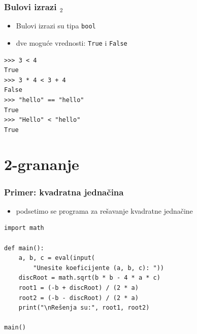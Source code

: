 \documentclass[utf8,compress,aspectratio=169]{beamer}
\begin{document}

\begin{frame}[fragile]
  \frametitle{Bulovi izrazi $_2$}
  \begin{itemize}
    \item Bulovi izrazi su tipa \texttt{bool}
    \item dve moguće vrednosti: \texttt{True} i \texttt{False}
  \end{itemize}
\begin{verbatim}
>>> 3 < 4
True
>>> 3 * 4 < 3 + 4
False
>>> "hello" == "hello"
True
>>> "Hello" < "hello"
True
\end{verbatim}
\end{frame}

\section{2-grananje}

\begin{frame}[fragile]
  \frametitle{Primer: kvadratna jednačina}
  \begin{itemize}
    \item podsetimo se programa za rešavanje kvadratne jednačine
  \end{itemize}
\begin{verbatim}
import math

def main():
    a, b, c = eval(input(
        "Unesite koeficijente (a, b, c): "))
    discRoot = math.sqrt(b * b - 4 * a * c)
    root1 = (-b + discRoot) / (2 * a)
    root2 = (-b - discRoot) / (2 * a)
    print("\nRešenja su:", root1, root2)

main()
\end{verbatim}
\end{frame}
\end{document}
